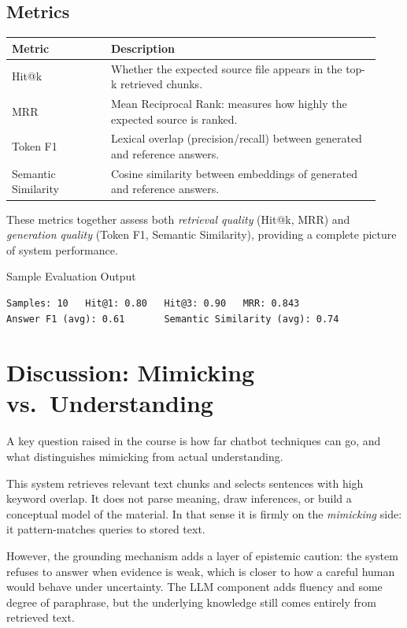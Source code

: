 \documentclass[12pt,a4paper]{article}
\begin{document}
\subsection{Metrics}

\begin{longtable}{|p{0.25\linewidth}|p{0.68\linewidth}|}
\hline
\textbf{Metric} & \textbf{Description} \\
\hline
Hit@k & Whether the expected source file appears in the top-k retrieved chunks. \\
\hline
MRR & Mean Reciprocal Rank: measures how highly the expected source is ranked. \\
\hline
Token F1 & Lexical overlap (precision/recall) between generated and reference answers. \\
\hline
Semantic Similarity & Cosine similarity between embeddings of generated and reference answers. \\
\hline
\end{longtable}

These metrics together assess both \textit{retrieval quality} (Hit@k, MRR) and
\textit{generation quality} (Token F1, Semantic Similarity), providing a complete
picture of system performance.

\begin{infobox}{Sample Evaluation Output}
\begin{verbatim}
Samples: 10   Hit@1: 0.80   Hit@3: 0.90   MRR: 0.843
Answer F1 (avg): 0.61       Semantic Similarity (avg): 0.74
\end{verbatim}
\end{infobox}

\section{Discussion: Mimicking vs.\ Understanding}
\label{sec:discussion}

A key question raised in the course is how far chatbot techniques can go, and what
distinguishes mimicking from actual understanding.

This system retrieves relevant text chunks and selects sentences with high keyword
overlap. It does not parse meaning, draw inferences, or build a conceptual model of
the material. In that sense it is firmly on the \textit{mimicking} side: it
pattern-matches queries to stored text.

However, the grounding mechanism adds a layer of epistemic caution: the system
refuses to answer when evidence is weak, which is closer to how a careful human
would behave under uncertainty. The LLM component adds fluency and some degree of
paraphrase, but the underlying knowledge still comes entirely from retrieved text.
\end{document}
